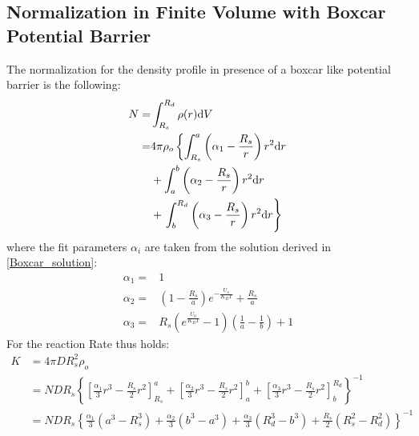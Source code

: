 \subsection{Normalization in Finite Volume with Boxcar Potential Barrier}
The normalization for the density profile in presence of a boxcar like potential barrier is the following:
\begin{align}
    N =& \int_{R_s}^{R_d} \rho(r) {\rm d} V  \\
    =& 4 \pi \rho_o \left\{ \int_{R_s} ^{a} \left( \alpha_1 - \frac{R_s}{r} \right) r^{2} {\rm d} r \right.\nonumber \\
    & +  \int_{a} ^{b} \left( \alpha_2 - \frac{R_s}{r} \right) r^{2} {\rm d} r \nonumber \\
    & + \left. \int_{b} ^{R_d} \left( \alpha_3 - \frac{R_s}{r} \right) r^{2} {\rm d} r\right\} 
    \label{cp_normalization}
\end{align}
where the fit parameters $\alpha_i$ are taken from the solution derived in \eqref{Boxcar_solution}:
\begin{align}
    \alpha_1 =& 1 \\
    \alpha_2 =&  \left( 1 - \frac{R_s}{a} \right) e^{-\frac{U_o}{K_B T}} + \frac{R_s}{a} \\
    \alpha_3 =& R_s \left(e^{\frac{U_0}{K_B T}} - 1\right) \left( \frac{1}{a} - \frac{1}{b} \right) + 1
    \label{fit_parameters}
\end{align}
For the reaction Rate thus holds:
\begin{align}
    K &= 4 \pi D R_s^{2} \rho_o \nonumber \\
    &= N D R_s \left\{ \left[\frac{\alpha_1}{3}r^{3} - \frac{R_s}{2}r^{2}\right]_{R_s}^{a} + \left[\frac{\alpha_2}{3}r^{3} - \frac{R_s}{2}r^{2}\right]_{a}^{b} + \left[\frac{\alpha_3}{3}r^{3} - \frac{R_s}{2}r^{2}\right]_{b}^{R_d}  \right\} ^{-1} \nonumber \\
    &= N D R_s \left\{ \frac{\alpha_1}{3}\left( a^{3} - R_s^{3} \right) + \frac{\alpha_2}{3}\left( b^{3} - a^{3} \right) + \frac{\alpha_3}{3}\left( R_d^{3} - b^{3} \right) + \frac{R_s}{2}\left( R_s^{2} - R_d^{2} \right) \right\}^{-1}
    \label{cp_rate}
\end{align}
